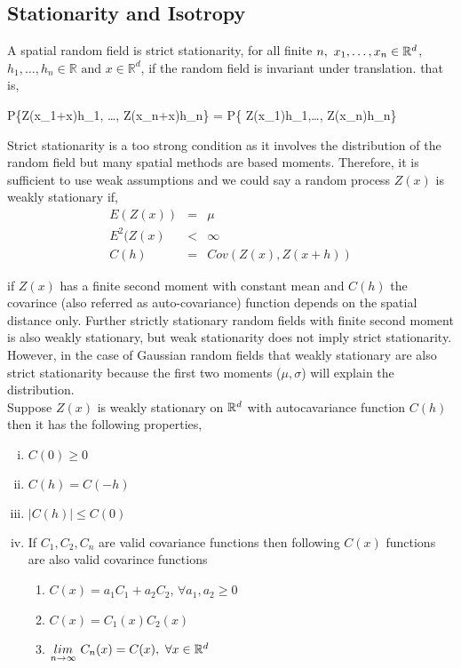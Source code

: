 \subsection{Stationarity and Isotropy}

A spatial random field is strict stationarity, for all finite $n,\ x_1,\ldots, x_n \in \mathbb{R}^d$, $h_1, \ldots, h_n\in\mathbb{R} \mbox{ and } x\in \mathbb{R}^d$, if the random field is invariant under translation. that is,

\beq
P\{Z(x_1+x)\le h_1, \ldots, Z(x_n+x)\le h_n\} = P\{ Z(x_1)\le h_1,\ldots, Z(x_n)\le h_n\}
\eeq

Strict stationarity is a too strong condition as it involves the distribution of the random field but many spatial methods are based moments. Therefore, it is sufficient to use weak assumptions and we could say a random process $Z(x)$ is weakly stationary if, 
\begin{eqnarray}
	E(Z(x))   & = & \mu \nonumber \\ 
	E^2(Z(x)  & < & \infty \nonumber \\  
	C(h)      & = & Cov(Z(x),Z(x+h))
\end{eqnarray}

if $Z(x)$ has a finite second moment with constant mean and $C(h)$ the covarince (also referred as auto-covariance) function depends on the spatial distance only. Further strictly stationary random fields with finite second moment is also weakly stationary, but weak stationarity does not imply strict stationarity. However, in the case of Gaussian random fields that weakly stationary are also strict stationarity because the first two moments ($\mu, \sigma$) will explain the distribution. \\

Suppose $Z(x)$ is weakly stationary on $\mathbb{R}^d$ with autocavariance function $C(h)$ then it has the following properties,

\begin{enumerate}[(i)]
	\item $C(0) \ge 0$
	\item $C(h) = C(-h)$
	\item $|C(h)| \le  C(0)$
	\item If $C_1, C_2, C_n$ are valid covariance functions then following $C(x)$ functions are also valid covarince functions
	      
	      \begin{enumerate}
	      	\item $C(x) = a_1C_1+a_2C_2$, $\forall a_1,a_2\ge 0$
	      	\item $C(x) = C_1(x)C_2(x)$
	      	\item $\underset{n\to\infty} {lim}\ C_n(x)=C(x),\ \forall x\in \R^d$ 
	      \end{enumerate}
	      
\end{enumerate}


